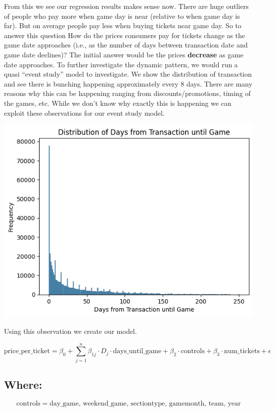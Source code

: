 \documentclass[
  12pt]{article}
\begin{document}
From this we see our regression results makes sense now. There are huge
outliers of people who pay more when game day is near (relative to when
game day is far). But on average people pay less when buying tickets
near game day. So to answer this question How do the prices consumers
pay for tickets change as the game date approaches (i.e., as the number
of days between transaction date and game date declines)? The initial
answer would be the prices \textbf{decrease} as game date approaches. To
further investigate the dynamic pattern, we would run a quasi ``event
study'' model to investigate. We show the distribution of transaction
and see there is bunching happening approximately every 8 days. There
are many reasons why this can be happening ranging from
discounts/promotions, timing of the games, etc. While we don't know why
exactly this is happening we can exploit these observations for our
event study model.

\includegraphics{images/6.png}

Using this observation we create our model.

\[
\text{price\_per\_ticket} = \beta_0 + \sum_{j=1}^{n} \beta_{1j} \cdot D_j \cdot \text{days\_until\_game} + \beta_2 \cdot \text{controls} + \beta_3 \cdot \text{num\_tickets} + \epsilon
\]

\subsection{Where:}\label{where}

\[
\mathbf{\mathrm{controls}} = \text{day\_game, weekend\_game, sectiontype, gamemonth, team, year}
\]
\end{document}
